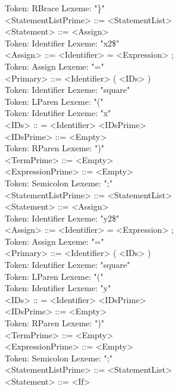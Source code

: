 \documentclass[11pt]{article}
\begin{document}
Token: RBrace    Lexeme: "\}" \\
        <StatementListPrime> ::= <StatementList> \\
        <Statement> ::= <Assign> \\
Token: Identifier        Lexeme: "x2\$" \\
        <Assign> ::= <Identifier> = <Expression> ; \\
Token: Assign    Lexeme: "=" \\
        <Primary> ::= <Identifier> ( <IDs> ) \\
Token: Identifier        Lexeme: "square" \\
Token: LParen    Lexeme: "(" \\
Token: Identifier        Lexeme: "x" \\
        <IDs> :: = <Identifier> <IDsPrime> \\
        <IDsPrime> ::= <Empty> \\
Token: RParen    Lexeme: ")" \\
        <TermPrime> ::= <Empty> \\
        <ExpressionPrime> ::= <Empty> \\
Token: Semicolon         Lexeme: ";" \\
        <StatementListPrime> ::= <StatementList> \\
        <Statement> ::= <Assign> \\
Token: Identifier        Lexeme: "y2\$" \\
        <Assign> ::= <Identifier> = <Expression> ; \\
Token: Assign    Lexeme: "=" \\
        <Primary> ::= <Identifier> ( <IDs> ) \\
Token: Identifier        Lexeme: "square" \\
Token: LParen    Lexeme: "(" \\
Token: Identifier        Lexeme: "y" \\
        <IDs> :: = <Identifier> <IDsPrime> \\
        <IDsPrime> ::= <Empty> \\
Token: RParen    Lexeme: ")" \\
        <TermPrime> ::= <Empty> \\
        <ExpressionPrime> ::= <Empty> \\
Token: Semicolon         Lexeme: ";" \\
        <StatementListPrime> ::= <StatementList> \\
        <Statement> ::= <If> \\
\end{document}
